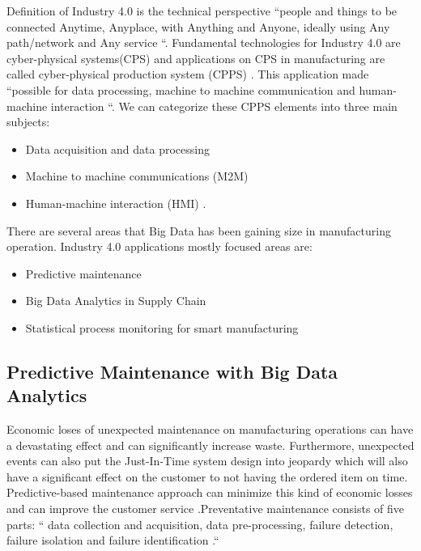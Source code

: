 \documentclass[sigconf]{acmart}
\begin{document}
\par Definition of Industry 4.0 is the technical perspective ``people and things to be connected Anytime, Anyplace, with Anything and Anyone, ideally using Any path/network and Any service \cite{saint-exupery}``. Fundamental technologies for Industry 4.0 are cyber-physical systems(CPS) and applications on CPS in manufacturing are called cyber-physical production system (CPPS) \cite{WAGNER2017125}. This application made ``possible for data processing, machine to machine communication and human-machine interaction \cite{WAGNER2017125}``. We can categorize these CPPS elements into three main subjects:

\begin{itemize}
    \item Data acquisition and data processing
    \item Machine to machine communications (M2M)
    \item Human-machine interaction (HMI) \cite{WAGNER2017125}.
\end{itemize}

\par There are several areas that Big Data has been gaining size in manufacturing operation. Industry 4.0 applications mostly focused areas are:

\begin{itemize}
    \item Predictive maintenance \cite{KUMAR2017}
    \item Big Data Analytics in Supply Chain  \cite{WANG201698}
    \item Statistical process monitoring for smart manufacturing \cite{HE2017} 
\end{itemize}


\subsection{Predictive Maintenance with Big Data Analytics}
Economic loses of unexpected maintenance on manufacturing operations can have a devastating effect and can significantly increase waste. Furthermore, unexpected events can also put the Just-In-Time system design into jeopardy which will also have a significant effect on the customer to not having the ordered item on time. Predictive-based maintenance approach can minimize this kind of economic losses and can improve the customer service \cite{KUMAR2017}.Preventative maintenance consists of five parts: `` data collection and acquisition, data pre-processing, failure detection, failure isolation and failure identification \cite{KUMAR2017}.``
\end{document}
